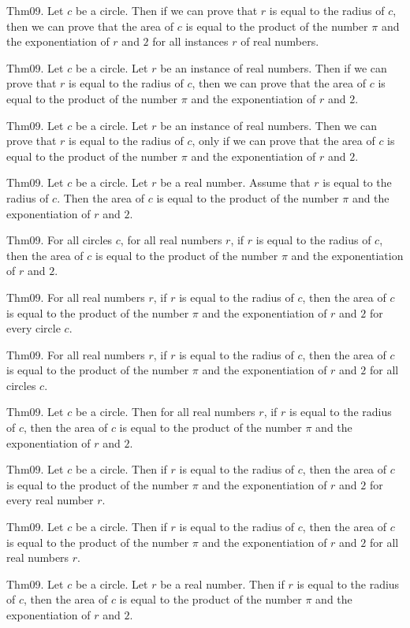 \documentclass{article}
\begin{document}
Thm09. Let $c$ be a circle. Then if we can prove that $r$ is equal to the radius of $c$, then we can prove that the area of $c$ is equal to the product of the number \(\pi\) and the exponentiation of $r$ and $2$ for all instances $r$ of real numbers.

Thm09. Let $c$ be a circle. Let $r$ be an instance of real numbers. Then if we can prove that $r$ is equal to the radius of $c$, then we can prove that the area of $c$ is equal to the product of the number \(\pi\) and the exponentiation of $r$ and $2$.

Thm09. Let $c$ be a circle. Let $r$ be an instance of real numbers. Then we can prove that $r$ is equal to the radius of $c$, only if we can prove that the area of $c$ is equal to the product of the number \(\pi\) and the exponentiation of $r$ and $2$.

Thm09. Let $c$ be a circle. Let $r$ be a real number. Assume that $r$ is equal to the radius of $c$. Then the area of $c$ is equal to the product of the number \(\pi\) and the exponentiation of $r$ and $2$.

Thm09. For all circles $c$, for all real numbers $r$, if $r$ is equal to the radius of $c$, then the area of $c$ is equal to the product of the number \(\pi\) and the exponentiation of $r$ and $2$.

Thm09. For all real numbers $r$, if $r$ is equal to the radius of $c$, then the area of $c$ is equal to the product of the number \(\pi\) and the exponentiation of $r$ and $2$ for every circle $c$.

Thm09. For all real numbers $r$, if $r$ is equal to the radius of $c$, then the area of $c$ is equal to the product of the number \(\pi\) and the exponentiation of $r$ and $2$ for all circles $c$.

Thm09. Let $c$ be a circle. Then for all real numbers $r$, if $r$ is equal to the radius of $c$, then the area of $c$ is equal to the product of the number \(\pi\) and the exponentiation of $r$ and $2$.

Thm09. Let $c$ be a circle. Then if $r$ is equal to the radius of $c$, then the area of $c$ is equal to the product of the number \(\pi\) and the exponentiation of $r$ and $2$ for every real number $r$.

Thm09. Let $c$ be a circle. Then if $r$ is equal to the radius of $c$, then the area of $c$ is equal to the product of the number \(\pi\) and the exponentiation of $r$ and $2$ for all real numbers $r$.

Thm09. Let $c$ be a circle. Let $r$ be a real number. Then if $r$ is equal to the radius of $c$, then the area of $c$ is equal to the product of the number \(\pi\) and the exponentiation of $r$ and $2$.
\end{document}
